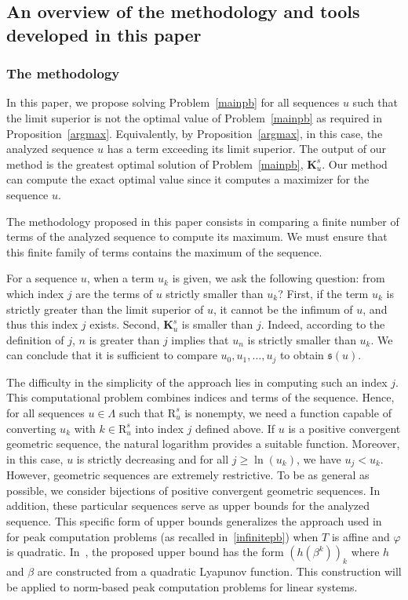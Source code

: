 \documentclass{article}
\def\valu#1{\mathfrak{s}(#1)}
\def\bigks{\mathbf{K}^s}
\def\gls#1{{\mathrm R}_{#1}}
\def\gsls#1{\gls{#1}^s}
\def\blue#1{#1}
\begin{document}
	\blue{
	\subsection{An overview of the methodology and tools developed in this paper}
	\label{overview}
	\subsubsection{The methodology}
	In this paper, we propose solving Problem~\ref{mainpb} for all sequences $u$ such that the limit superior is not the optimal value of Problem~\ref{mainpb} as required in Proposition~\ref{argmax}. Equivalently, by Proposition~\ref{argmax}, in this case, the analyzed sequence $u$ has a term exceeding its limit superior. The output of our method is the greatest optimal solution of Problem~\ref{mainpb}, $\bigks_u$. Our method can compute the exact optimal value since it computes a maximizer for the sequence $u$.}

\blue{	
The methodology proposed in this paper consists in comparing a finite number of terms of the analyzed sequence to compute its maximum. We must ensure that this finite family of terms contains the maximum of the sequence. 
}

\blue{
For a sequence $u$, when a term $u_k$ is given, we ask the following question: from which index $j$ are the terms of $u$ strictly smaller than $u_k$? First, if the term $u_k$ is strictly greater than the limit superior of $u$, it cannot be the infimum of $u$, and thus this index $j$ exists. Second, $\bigks_u$ is smaller than $j$. Indeed, according to the definition of $j$, $n$ is greater than $j$ implies that $u_n$ is strictly smaller than $u_k$. We can conclude that it is sufficient to compare $u_0,u_1,\ldots,u_j$ to obtain $\valu{u}$.
}

\blue{
The difficulty in the simplicity of the approach lies in computing such an index $j$. This computational problem combines indices and terms of the sequence. Hence, for all sequences $u\in\Lambda$ such that $\gsls{u}$ is nonempty, we need a function capable of converting $u_k$ with $k\in\gsls{u}$ into index $j$ defined above. If $u$ is a positive convergent geometric sequence, the natural logarithm provides a suitable function. Moreover, in this case, $u$ is strictly decreasing and for all $j\geq \ln(u_k)$, we have $u_j<u_k$. However, geometric sequences are extremely restrictive. To be as general as possible, we consider bijections of positive convergent geometric sequences. In addition, these particular sequences serve as upper bounds for the analyzed sequence. This specific form of upper bounds generalizes the approach used in~\cite{adje13052025} for peak computation problems (as recalled in~\eqref{infinitepb}) when $T$ is affine and $\varphi$ is quadratic. In~\cite{adje13052025}, the proposed upper bound has the form $(h(\beta^k))_k$ where $h$ and $\beta$ are constructed from a quadratic Lyapunov function. This construction will be applied to norm-based peak computation problems for linear systems.
}
\end{document}
